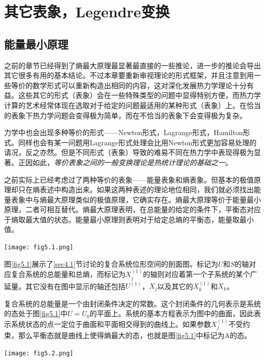 \chapter{其它表象，Legendre变换}
\label{chap5}

\section{能量最小原理}
\label{sec5.1}

之前的章节已经得到了熵最大原理最显著最直接的一些推论，进一步的推论会导出其它很多有用的基本结论。不过本章要重新审视理论的形式框架，并且注意到用一些等价的数学形式可以重新构造出相同的内容，这对深化发展热力学理论十分有益。这些其它的形式（表象）会在一些特殊类型的问题中显得特别方便，而热力学计算的艺术经常体现在选取对于给定的问题最适用的某种形式（表象）上。在恰当的表象下热力学问题会变得极为简单，而在不恰当的表象下会变得极为复杂。

力学中也会出现多种等价的形式——Newton形式，Lagrange形式，Hamilton形式。同样也会有某一问题用Lagrange形式处理会比用Newton形式更加容易处理的请况，反之亦然。但是不同形式（表象）导致的难易不同在热力学中表现得极为显著。正因如此，{\it 等价表象之间的一般变换理论是热统计理论的基础之一}。

之前实际上已经考虑过了两种等价的表象——能量表象和熵表象。但基本的极值原理却只在熵表述中构造出来。如果这两种表述的理论地位相同，我们就必须找出能量表象中与熵最大原理类似的极值原理，它确实存在。熵最大原理等价于能量最小原理，二者可相互替代。熵最大原理表明，在总能量的给定的条件下，平衡态对应于熵取最大值的状态。能量最小原理则表明对于给定总熵的平衡态，能量取最小值。

{
  \centering
  \texttt{[image: fig5.1.png]}
  \label{fig5.1}
}

图\ref{fig5.1}展示了\ref{sec4.1}节讨论的复合系统位形空间的剖面图。标记为$U$和$S$的轴对应复合系统的总能量和总熵，而标记为$X_j^{(1)}$的轴则对应着第一个子系统的某个广延量。其它没有在图中显示的轴还包括$U^{(1)}$，$X_j$以及其它的$X_k^{(1)}$和$X_k$。

复合系统的总能量是一个由封闭条件决定的常数。这个封闭条件的几何表示是系统的态处于图\ref{fig5.1}中$U=U_0$的平面上。系统的基本方程表示为图中的曲面，因此表示系统状态的点一定位于曲面和平面相交得到的曲线上。如果参数$X_j^{(1)}$不受约束，那么平衡态就是曲线上使得熵最大的态，也就是图\ref{fig5.1}中标记为A的态。

{
	\centering
	\texttt{[image: fig5.2.png]}
	\label{fig5.2}
}

